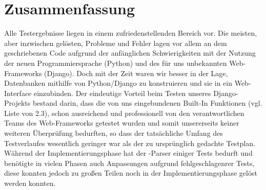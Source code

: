 

\chapter{Zusammenfassung}
Alle Testergebnisse liegen in einem zufriedenstellenden Bereich vor.  Die
meisten, aber inzwischen gelösten, Probleme und Fehler lagen vor allem an dem
geschriebenen Code aufgrund der anfänglichen Schwierigkeiten mit der Nutzung
der neuen Programmiersprache (Python) und des für uns unbekannten
Web-Frameworks (Django).
Doch mit der Zeit waren wir besser in der Lage, Datenbanken mithilfe von
Python/Django zu konstruieren und sie in ein Web-Interface einzubinden.  Der
eindeutige Vorteil beim Testen unseres Django-Projekts bestand darin, dass die
von uns eingebundenen Built-In Funktionen (vgl. Liste von 2.3), schon
ausreichend und professionell von den verantwortlichen Teams des Web-Frameworks
getestet wurden und somit unsererseits keiner weiteren Überprüfung bedurften,
so dass der tatsächliche Umfang des Testverlaufes wesentlich geringer war als
der zu ursprünglich gedachte Testplan. 
Während der Implementierungsphase hat der \BibTeX -Parser einiger Tests bedurft
und benötigte in vielen Phasen auch Anpassungen aufgrund fehlgeschlagenrer
Tests, diese konnten jedoch zu großen Teilen noch in der
Implementierungsphase gelöst werden konnten.

